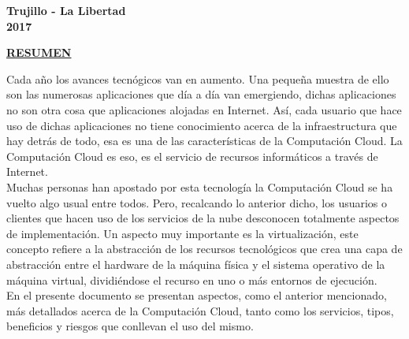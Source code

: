 \documentclass[a4paper, 12pt]{report}
\begin{document}
\vskip 3cm
\begin{center}    
	{\bf {\fontsize{14}{16.8}\selectfont Trujillo - La Libertad
	\\ 2017 }}
\end{center} 
\newpage
\pagestyle{plain}
\doublespacing
{}
\vspace*{6em}
\begin{center}
{\bf{\large{\underline{RESUMEN}}}}
\end{center}
\begin{justify}
Cada año los avances tecnógicos van en aumento. Una pequeña muestra de ello son las numerosas aplicaciones que día a día van emergiendo, dichas aplicaciones no son otra cosa que aplicaciones alojadas en Internet. Así, cada usuario que hace uso de dichas aplicaciones no tiene conocimiento acerca de la infraestructura que hay detrás de todo, esa es una de las características de la Computación Cloud. La Computación Cloud es eso, es el servicio de recursos informáticos a través de Internet. \\
Muchas personas han apostado por esta tecnología la Computación Cloud se ha vuelto algo usual entre todos. Pero, recalcando lo anterior dicho, los usuarios o clientes que hacen uso de los servicios de la nube desconocen totalmente aspectos de implementación. Un aspecto muy importante es la virtualización, este concepto refiere a la abstracción de los recursos tecnológicos que crea una capa de abstracción entre el hardware de la máquina física y el sistema operativo de la máquina virtual, dividiéndose el recurso en uno o más entornos de ejecución.\\
En el presente documento se presentan aspectos, como el anterior mencionado, más detallados acerca de la Computación Cloud, tanto como los servicios, tipos, beneficios y riesgos que conllevan el uso del mismo.
\end{justify}
\newpage
\end{document}
